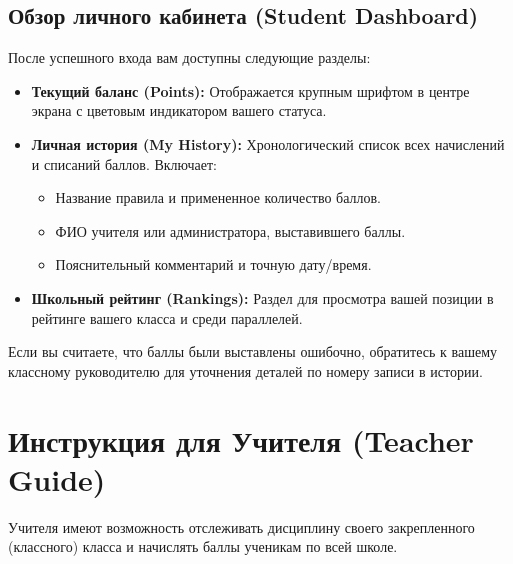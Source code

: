 \documentclass[12pt,a4paper]{article}
\begin{document}
\subsection{Обзор личного кабинета (Student Dashboard)}
После успешного входа вам доступны следующие разделы:
\begin{itemize}
    \item \textbf{Текущий баланс (Points):} Отображается крупным шрифтом в центре экрана с цветовым индикатором вашего статуса.
    \item \textbf{Личная история (My History):} Хронологический список всех начислений и списаний баллов. Включает:
    \begin{itemize}
        \item Название правила и примененное количество баллов.
        \item ФИО учителя или администратора, выставившего баллы.
        \item Пояснительный комментарий и точную дату/время.
    \end{itemize}
    \item \textbf{Школьный рейтинг (Rankings):} Раздел для просмотра вашей позиции в рейтинге вашего класса и среди параллелей.
\end{itemize}

\begin{infoBox}
Если вы считаете, что баллы были выставлены ошибочно, обратитесь к вашему классному руководителю для уточнения деталей по номеру записи в истории.
\end{infoBox}

\newpage

\section{Инструкция для Учителя (Teacher Guide)}

Учителя имеют возможность отслеживать дисциплину своего закрепленного (классного) класса и начислять баллы ученикам по всей школе.
\end{document}
